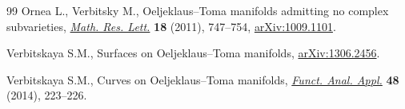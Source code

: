 \documentclass[10pt,a4paper]{amsart}
\newcommand{\6}{\partial}
\numberwithin{equation}{section}
\begin{document}
\begin{thebibliography}{99}
Ornea L., Verbitsky M., Oeljeklaus--{T}oma manifolds admitting no complex
 subvarieties,
 \href{https://doi.org/10.4310/MRL.2011.v18.n4.a12}{\textit{Math. Res. Lett.}}
 \textbf{18} (2011), 747--754,
 \href{http://arxiv.org/abs/1009.1101}{arXiv:1009.1101}.

Verbitskaya S.M., Surfaces on {O}eljeklaus--{T}oma manifolds,
 \href{http://arxiv.org/abs/1306.2456}{arXiv:1306.2456}.

Verbitskaya S.M., Curves on {O}eljeklaus--{T}oma manifolds,
 \href{https://doi.org/10.1007/s10688-014-0063-y}{\textit{Funct. Anal. Appl.}}
 \textbf{48} (2014), 223--226.

\end{thebibliography}
\end{document}

